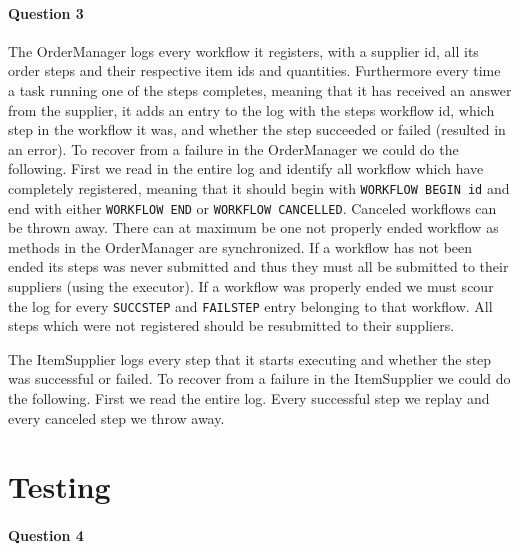 \documentclass[a4paper, 11pt]{article}
\begin{document}

\paragraph{Question 3} %
\label{par:question_3}
The OrderManager logs every workflow it registers, with a supplier id, all its order steps and their respective item ids and quantities. Furthermore every time a task running one of the steps completes, meaning that it has received an answer from the supplier, it adds an entry to the log with the steps workflow id, which step in the workflow it was, and whether the step succeeded or failed (resulted in an error). To recover from a failure in the OrderManager we could do the following. First we read in the entire log and identify all workflow which have completely registered, meaning that it should begin with \texttt{WORKFLOW BEGIN id} and end with either \texttt{WORKFLOW END} or \texttt{WORKFLOW CANCELLED}. Canceled workflows can be thrown away. There can at maximum be one not properly ended workflow as methods in the OrderManager are synchronized. If a workflow has not been ended its steps was never submitted and thus they must all be submitted to their suppliers (using the executor). If a workflow was properly ended we must scour the log for every \texttt{SUCCSTEP} and \texttt{FAILSTEP} entry belonging to that workflow. All steps which were not registered should be resubmitted to their suppliers.


The ItemSupplier logs every step that it starts executing and whether the step was successful or failed. To recover from a failure in the ItemSupplier we could do the following. First we read the entire log. Every successful step we replay and every canceled step we throw away.


\section{Testing} %
\label{sec:testing}

\paragraph{Question 4} %
\label{par:question_4}
\end{document}
